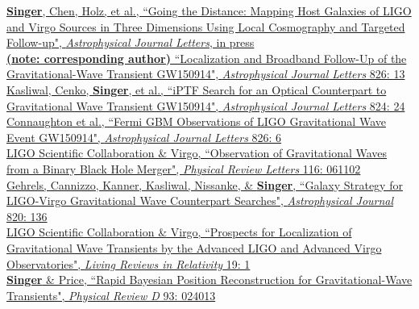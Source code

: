 \documentclass[10pt, letterpaper]{article} %
\newcommand{\years}[1]{\marginnote{\scriptsize #1}} %
\begin{document}
\years{2015}\href{https://arxiv.org/abs/1603.07333}{\textbf{Singer}, Chen, Holz, et al., “Going the Distance: Mapping Host Galaxies of LIGO and Virgo Sources in Three Dimensions Using Local Cosmography and Targeted Follow-up", \emph{Astrophysical Journal Letters}, in press}\\[0.125cm]
%
\years{2016}\href{http://dx.doi.org/10.3847/2041-8205/826/1/L13}{\textbf{(note: corresponding author)} “Localization and Broadband Follow-Up of the Gravitational-Wave Transient GW150914", \emph{Astrophysical Journal Letters} 826: 13}\\[0.125cm]
%
\years{2016}\href{http://dx.doi.org/10.3847/2041-8205/824/2/L24}{Kasliwal, Cenko, \textbf{Singer}, et al., “iPTF Search for an Optical Counterpart to Gravitational Wave Transient GW150914", \emph{Astrophysical Journal Letters} 824: 24}\\[0.125cm]
%
\years{2016}\href{http://dx.doi.org/10.3847/2041-8205/826/1/L6}{Connaughton et al., “Fermi GBM Observations of LIGO Gravitational Wave Event GW150914", \emph{Astrophysical Journal Letters} 826: 6}\\[0.125cm]
%
%
\years{2016}\href{http://dx.doi.org/10.1103/PhysRevLett.116.061102}{LIGO Scientific Collaboration \& Virgo, “Observation of Gravitational Waves from a Binary Black Hole Merger", \emph{Physical Review Letters} 116: 061102}\\[0.125cm]
% 
\years{2016}\href{http://dx.doi.org/10.3847/0004-637X/820/2/136}{Gehrels, Cannizzo, Kanner, Kasliwal,  Nissanke, \& \textbf{Singer}, “Galaxy Strategy for LIGO-Virgo Gravitational Wave Counterpart Searches", \emph{Astrophysical Journal} 820: 136}\\[0.125cm]
%
\years{2016}\href{http://dx.doi.org/10.1007/lrr-2016-1}{LIGO Scientific Collaboration \& Virgo, “Prospects for Localization of Gravitational Wave Transients by the Advanced LIGO and Advanced Virgo Observatories", \emph{Living Reviews in Relativity} 19: 1}\\[0.125cm]
%
\years{2016}\href{http://dx.doi.org/10.1103/PhysRevD.93.024013}{\textbf{Singer} \& Price, “Rapid Bayesian Position Reconstruction for Gravitational-Wave Transients", \emph{Physical Review D} 93: 024013}\\[0.125cm]
%
\end{document}
